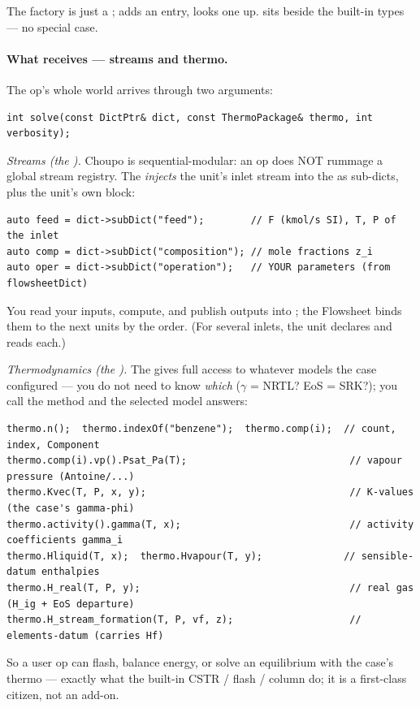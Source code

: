 \documentclass[11pt,a4paper]{article}
\begin{document}
\noindent The factory is just a ;
 adds an entry,  looks one up.  
sits beside the built-in types --- no special case.

\paragraph{What  receives --- streams and thermo.}  The
op's whole world arrives through two arguments:
\begin{lstlisting}
int solve(const DictPtr& dict, const ThermoPackage& thermo, int verbosity);
\end{lstlisting}

\emph{Streams (the ).}  Choupo is sequential-modular: an op
does NOT rummage a global stream registry.  The 
\emph{injects} the unit's inlet stream into the  as sub-dicts,
plus the unit's own  block:
\begin{lstlisting}
auto feed = dict->subDict("feed");        // F (kmol/s SI), T, P of the inlet
auto comp = dict->subDict("composition"); // mole fractions z_i
auto oper = dict->subDict("operation");   // YOUR parameters (from flowsheetDict)
\end{lstlisting}
You read your inputs, compute, and publish outputs into ;
the Flowsheet binds them to the next units by the 
order.  (For several inlets, the unit declares  and
reads each.)

\emph{Thermodynamics (the ).}  The 
gives full access to whatever models the case configured --- you do not
need to know \emph{which} ($\gamma$ = NRTL? EoS = SRK?); you call the
method and the selected model answers:
\begin{lstlisting}
thermo.n();  thermo.indexOf("benzene");  thermo.comp(i);  // count, index, Component
thermo.comp(i).vp().Psat_Pa(T);                            // vapour pressure (Antoine/...)
thermo.Kvec(T, P, x, y);                                   // K-values (the case's gamma-phi)
thermo.activity().gamma(T, x);                             // activity coefficients gamma_i
thermo.Hliquid(T, x);  thermo.Hvapour(T, y);              // sensible-datum enthalpies
thermo.H_real(T, P, y);                                    // real gas (H_ig + EoS departure)
thermo.H_stream_formation(T, P, vf, z);                    // elements-datum (carries Hf)
\end{lstlisting}
So a user op can flash, balance energy, or solve an equilibrium with the
case's thermo --- exactly what the built-in CSTR / flash / column do; it
is a first-class citizen, not an add-on.
\end{document}
